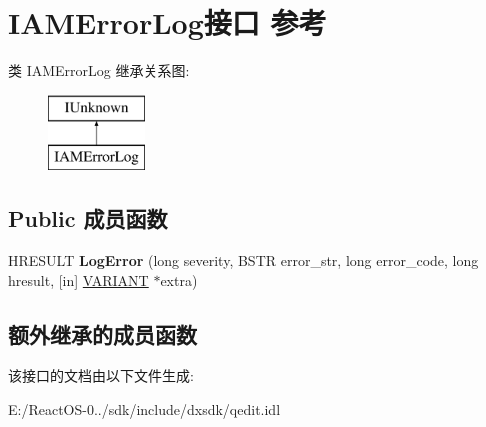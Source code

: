 \hypertarget{interface_i_a_m_error_log}{}\section{I\+A\+M\+Error\+Log接口 参考}
\label{interface_i_a_m_error_log}
类 I\+A\+M\+Error\+Log 继承关系图\+:\begin{figure}[H]
\begin{center}
\leavevmode
\includegraphics[height=2.000000cm]{interface_i_a_m_error_log}
\end{center}
\end{figure}
\subsection*{Public 成员函数}
\begin{DoxyCompactItemize}
\item 
\mbox{\label{interface_i_a_m_error_log_a04b041834fe15a2e9ce00415c6b4297a}} 
H\+R\+E\+S\+U\+LT {\bfseries Log\+Error} (long severity, B\+S\+TR error\+\_\+str, long error\+\_\+code, long hresult, \mbox{[}in\mbox{]} \hyperlink{structtag_v_a_r_i_a_n_t}{V\+A\+R\+I\+A\+NT} $\ast$extra)
\end{DoxyCompactItemize}
\subsection*{额外继承的成员函数}


该接口的文档由以下文件生成\+:\begin{DoxyCompactItemize}
\item 
E\+:/\+React\+O\+S-\/0../sdk/include/dxsdk/qedit.\+idl\end{DoxyCompactItemize}
